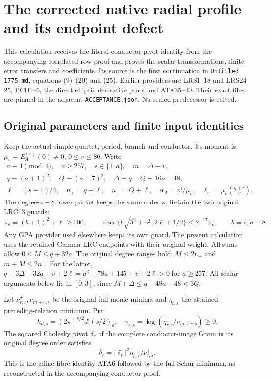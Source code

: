 \begingroup
\section{The corrected native radial profile and its endpoint defect}
\label{sec:CRS}

This calculation receives the literal conductor-pivot identity from the
accompanying correlated-row proof and proves the scalar transformations,
finite error transfers and coefficients. Its source is the first
continuation in \texttt{Untitled 1775.md}, equations (9)--(20) and (25).
Earlier providers are LRS1--18 and LRS24--25, PCB1--6, the direct elliptic
derivative proof and ATA35--40. Their exact files are pinned in the
adjacent \texttt{ACCEPTANCE.json}. No sealed predecessor is edited.

\subsection{Original parameters and finite input identities}

Keep the actual simple quartet, period, branch and conductor. Its moment
is $\mu_v=E_A^{(v)}(0)\ne0$, $0\le v\le80$. Write
\[
\begin{gathered}
 a\equiv1\pmod4,\quad a\ge257,\quad s\in\{1,a\},\quad m=\Delta-v,\\
 q=(a+1)^2,\quad Q=(a-7)^2,\quad \Delta=q-Q=16a-48,\\
 \ell=(s-1)/4,\quad n_+=q+\ell,\quad n_-=Q+\ell,\quad
 \alpha_A=v!/\mu_v,\quad \ell_r=\mu_v\binom{q+r}{v}.
\end{gathered}\tag{CRS1}
\]
The degree-$a-8$ lower packet keeps the same order $s$. Retain the two
original LRC13 guards:
\[
 n_b=(b+1)^2+\ell\ge100,\qquad
 \max\{b\sqrt{\delta^2+\gamma^2},2\ell+1/2\}
 \le2^{-17}n_b,\qquad b=a,a-8.                         \tag{CRS2}
\]
Any GPA provider used elsewhere keeps its own guard. The present
calculation uses the retained Gamma LRC endpoints with their original
weight. All sums allow $0\le M\le q+32a$.
The original degree ranges hold: $M\le2n_+$ and $m+M\le2n_-$.
For the latter,
$q-3\Delta-32a+v+2\ell=a^2-78a+145+v+2\ell>0$ for $a\ge257$.
All scalar arguments below lie in $[0,3]$, since
$M+\Delta\le q+48a-48<3Q$.

Let $\nu^+_{r,s},\nu^-_{m+r,s}$ be the original full monic minima and
$\eta_{r,s}$ the attained preceding-relation minimum. Put
\[
 h_{d,s}=(2\pi)^{s/2}d!(s/2)_d,\quad
 \gamma_{r,s}=\log(\eta_{r,s}/\nu^-_{m+r,s})\ge0.
\]
The squared Cholesky pivot $\delta_r$ of the complete conductor-image
Gram in its original degree order satisfies
\[
 \delta_r=|\ell_r|^2\eta_{r,s}/\nu^+_{r,s}.             \tag{CRS3}
\]
This is the affine fibre identity ATA6 followed by the full Schur
minimum, as reconstructed in the accompanying conductor proof.

